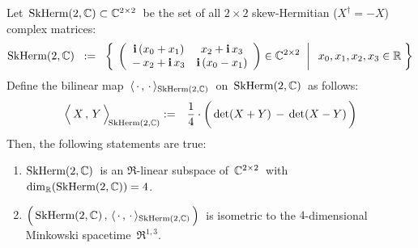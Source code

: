 \begin{proposition}
\mbox{}
\vskip 0.1cm
\noindent
Let \,$\textnormal{SkHerm}(2,\mathbb{C}) \subset \mathbb{C}^{2 \times 2}$\, be the set of all $2 \times 2$ skew-Hermitian ($X^{\dagger} = -X$) complex matrices:
\begin{equation*}
\textnormal{SkHerm}(2,\mathbb{C})
\;\; := \;\;
	\left\{\;
		\left.\left(\begin{array}{cc}
			\textnormal{\bf i}\,(x_{0}+x_{1}) & x_{2}+\textnormal{\bf i}\,x_{3}
			\\
			-\,x_{2}+\textnormal{\bf i}\,x_{3} & \textnormal{\bf i}\,(x_{0}-x_{1})
			\end{array}\right)
		\in
		\mathbb{C}^{2 \times 2}
		\;\;\right\vert\;\;
		x_{0}, x_{1}, x_{2}, x_{3} \in \mathbb{R}
		\;\right\}
\end{equation*}
Define the bilinear map \,$\langle\,\cdot\,,\,\cdot\,\rangle_{\textnormal{SkHerm}(2,\mathbb{C})}$\, on \,$\textnormal{SkHerm}(2,\mathbb{C})$\, as follows:
\begin{eqnarray*}
\left\langle\,
	\overset{{\color{white}.}}{X}
	\, , \,
	Y
	\,\right\rangle_{\!\SkHermTwoC}
& := &
	\dfrac{1}{4}\cdot\left(\,
		\det(X + Y)
		\, \overset{{\color{white}1}}{-} \,
		\det(X - Y)
		\,\right)
\end{eqnarray*}
Then, the following statements are true:
\begin{enumerate}
\item
	$\textnormal{SkHerm}(2,\mathbb{C})$\, is an $\Re$-linear subspace of \,$\mathbb{C}^{2 \times 2}$\, with \,$\dim_{\mathbb{R}}(\textnormal{SkHerm}(2,\mathbb{C})) = 4$.\,
\item
	$\left(\,\overset{{\color{white}.}}{\SkHermTwoC}\,,\,\langle\,\cdot\,,\,\cdot\,\rangle_{\SkHermTwoC}\,\right)$\,
	is isometric to the $4$-dimensional Minkowski spacetime \,$\Re^{1,3}$.\,
\end{enumerate}
\end{proposition}
\proof
